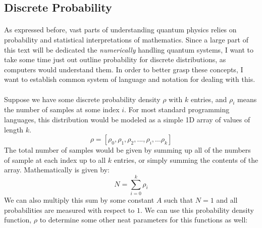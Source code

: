 \documentclass[12pt,letterpaper]{book}
\begin{document}

\subsection*{Discrete Probability}
\paragraph*{}As expressed before, vast parts of understanding quantum physics relies on probability and statistical interpretations of mathematics. Since a large part of this text will be dedicated the \textit{numerically} handling quantum systems, I want to take some time just out outline probability for discrete distributions, as computers would understand them. In order to better grasp these concepts, I want to establish common system of language and notation for dealing with this.
\paragraph*{}Suppose we have some discrete probability density $\rho$ with $k$ entries, and $\rho_i$ means the number of samples at some index $i$. For most standard programming languages, this distribution would be modeled as a simple 1D array of values of length $k$.
\begin{equation}
\label{rho}
\rho = [ \rho_0 , \rho_1 , \rho_2 , ... , \rho_i , ... \rho_k ]
\end{equation}
The total number of samples would be given by summing up all of the numbers of sample at each index up to all $k$ entries, or simply summing the contents of the array. Mathematically is given by:
\begin{equation}
\label{total disc samples}
N = \sum_{i=0}^{k}\rho_i
\end{equation}
We can also multiply this sum by some constant $A$ such that $N = 1$ and all probabilities are measured with respect to $1$. We can use this probability density function, $\rho$ to determine some other neat parameters for this functions as well:
\end{document}

